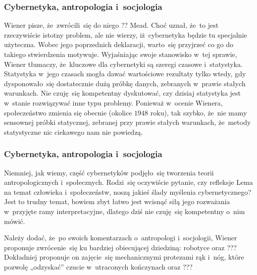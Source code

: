 \documentclass[10pt,t]{beamer}
\begin{document}
\begin{frame}
  \frametitle{Cybernetyka, antropologia i~socjologia}


  Wiener pisze, że~zwrócili~się do niego ?? Mead. Choć uznał, że~to jest
  rzeczywiście istotny problem, ale nie wierzy, iż~cybernetyka będzie tu
  specjalnie użyteczna. Wobec jego poprzednich deklaracji, warto~się
  przyjrzeć co go do takiego stwierdzenia motywuje. Wyjaśniając swoje
  stanowisko w~tej sprawie, Wiener tłumaczy, że~kluczowe dla cybernetyki
  są szeregi czasowe i~statystyka. Statystyka w~jego czasach
  mogła dawać wartościowe rezultaty tylko wtedy, gdy dysponowało~się
  dostatecznie dużą próbkę danych, zebranych w~prawie stałych warunkach.
  Nie czuję~się kompetentny dyskutować, czy dzisiaj statystyka jest
  w~stanie rozwiązywać inne typu problemy. Ponieważ w~ocenie Wienera,
  społeczeństwo zmienia się obecnie (okolice $1948$ roku), tak szybko,
  że~nie mamy sensownej próbki statycznej, zebranej przy
  \alert{prawie stałych} warunkach, że~metody statystyczne nic ciekawego nam
  nie powiedzą.

\end{frame}





\begin{frame}
  \frametitle{Cybernetyka, antropologia i~socjologia}


  Niemniej, jak wiemy, część cybernetyków podjęło~się tworzenia teorii
  antropologicznych i~społecznych. Rodzi~się oczywiście pytanie, czy
  refleksje Lema na temat człowieka i~społeczeństw, noszą jakieś ślady
  myślenia cybernetycznego? Jest to trudny temat, bowiem zbyt łatwo jest
  wcisnąć siłą jego rozważania w~przyjęte ramy interpretacyjne, dlatego
  dziś nie czuję~się kompetentny o~nim mówić.

  Należy dodać, że~po swoich komentarzach o~antropologi i~socjologii,
  Wiener proponuje zwrócenie~się ku bardziej obiecującej dziedziną:
  robotyce oraz ???
  Dokładniej proponuje on zajęcie~się mechanicznymi protezami rąk i~nóg,
  które pozwolę „odzyskać” czucie w~utraconych kończynach oraz ???

\end{frame}
\end{document}
